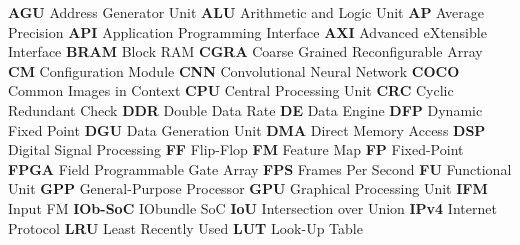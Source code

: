 \textbf{AGU} Address Generator Unit\newline
\textbf{ALU} Arithmetic and Logic Unit\newline
\textbf{AP} Average Precision\newline
\textbf{API} Application Programming Interface\newline
\textbf{AXI} Advanced eXtensible Interface \newline
\textbf{BRAM} Block RAM\newline
\textbf{CGRA} Coarse Grained Reconfigurable Array\newline
\textbf{CM} Configuration Module\newline
\textbf{CNN} Convolutional Neural Network \newline
\textbf{COCO} Common Images in Context\newline
\textbf{CPU} Central Processing Unit\newline
\textbf{CRC} Cyclic Redundant Check\newline
\textbf{DDR} Double Data Rate\newline
\textbf{DE} Data Engine\newline
\textbf{DFP} Dynamic Fixed Point\newline
\textbf{DGU} Data Generation Unit\newline
\textbf{DMA} Direct Memory Access\newline
\textbf{DSP} Digital Signal Processing\newline
\textbf{FF} Flip-Flop\newline
\textbf{FM} Feature Map\newline
\textbf{FP} Fixed-Point\newline
\textbf{FPGA} Field Programmable Gate Array\newline
\textbf{FPS} Frames Per Second\newline
\textbf{FU} Functional Unit\newline
\textbf{GPP} General-Purpose Processor\newline
\textbf{GPU} Graphical Processing Unit \newline
\textbf{IFM} Input FM \newline
\textbf{IOb-SoC} IObundle SoC \newline
\textbf{IoU} Intersection over Union\newline
\textbf{IPv4} Internet Protocol\newline
\textbf{LRU} Least Recently Used\newline
\textbf{LUT} Look-Up Table\newline
